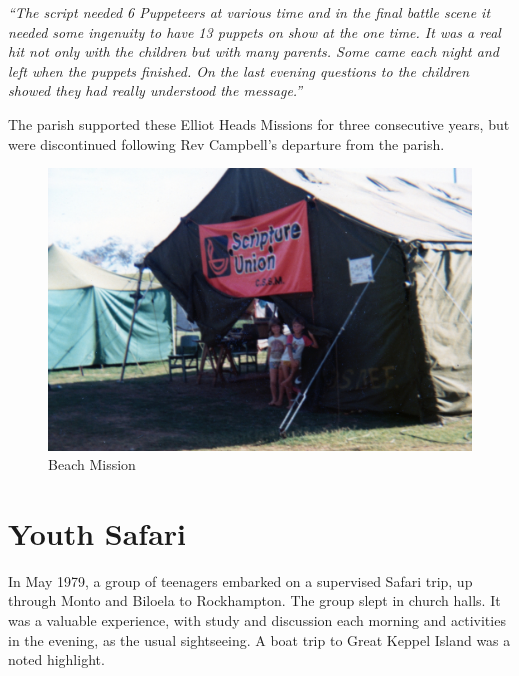 \emph{``The script needed 6 Puppeteers at various time and in the final battle scene it needed some ingenuity to have 13 puppets on show at the one time. It was a real hit not only with the children but with many parents. Some came each night and left when the puppets finished. On the last evening questions to the children showed they had really understood the message.''}



The parish supported these Elliot Heads Missions for three consecutive years, but were discontinued following Rev Campbell's departure from the parish.









\begin{figure}[!htb]
\begin{center}
\includegraphics[width=1.\textwidth,center]{../images/beachMission1980.jpg}
\caption{Beach Mission}
\end{center}
\end{figure}




\section{Youth Safari}



In May 1979, a group of teenagers embarked on a supervised Safari trip, up through Monto and Biloela to Rockhampton. The group slept in church halls. It was a valuable experience, with study and discussion each morning and activities in the evening, as the usual sightseeing. A boat trip to Great Keppel Island was a noted highlight.




